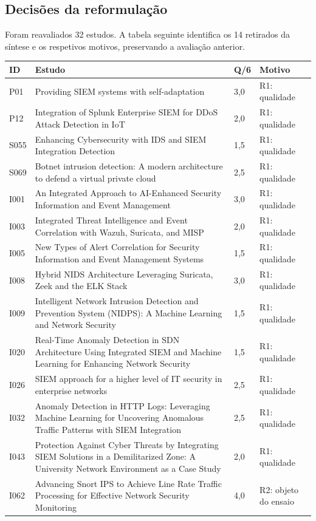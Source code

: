 \documentclass[11pt,a4paper]{article}
\begin{document}
\subsection{Decisões da reformulação}
Foram reavaliados 32 estudos. A tabela seguinte identifica os 14 retirados da síntese e os respetivos motivos, preservando a avaliação anterior.
\small\begin{longtable}{@{}P{.8cm}P{8.8cm}P{1cm}P{2cm}@{}}\toprule
ID & Estudo & Q/6 & Motivo\\\midrule\endhead
P01 & Providing SIEM systems with self-adaptation & 3,0 & R1: qualidade\\
P12 & Integration of Splunk Enterprise SIEM for DDoS Attack Detection in IoT & 2,0 & R1: qualidade\\
S055 & Enhancing Cybersecurity with IDS and SIEM Integration Detection & 1,5 & R1: qualidade\\
S069 & Botnet intrusion detection: A modern architecture to defend a virtual private cloud & 2,5 & R1: qualidade\\
I001 & An Integrated Approach to AI-Enhanced Security Information and Event Management & 3,0 & R1: qualidade\\
I003 & Integrated Threat Intelligence and Event Correlation with Wazuh, Suricata, and MISP & 2,0 & R1: qualidade\\
I005 & New Types of Alert Correlation for Security Information and Event Management Systems & 1,5 & R1: qualidade\\
I008 & Hybrid NIDS Architecture Leveraging Suricata, Zeek and the ELK Stack & 3,0 & R1: qualidade\\
I009 & Intelligent Network Intrusion Detection and Prevention System (NIDPS): A Machine Learning and Network Security & 1,5 & R1: qualidade\\
I020 & Real-Time Anomaly Detection in SDN Architecture Using Integrated SIEM and Machine Learning for Enhancing Network Security & 1,5 & R1: qualidade\\
I026 & SIEM approach for a higher level of IT security in enterprise networks & 2,5 & R1: qualidade\\
I032 & Anomaly Detection in HTTP Logs: Leveraging Machine Learning for Uncovering Anomalous Traffic Patterns with SIEM Integration & 2,5 & R1: qualidade\\
I043 & Protection Against Cyber Threats by Integrating SIEM Solutions in a Demilitarized Zone: A University Network Environment as a Case Study & 2,0 & R1: qualidade\\
I062 & Advancing Snort IPS to Achieve Line Rate Traffic Processing for Effective Network Security Monitoring & 4,0 & R2: objeto do ensaio\\
\bottomrule\end{longtable}\normalsize
\end{document}
